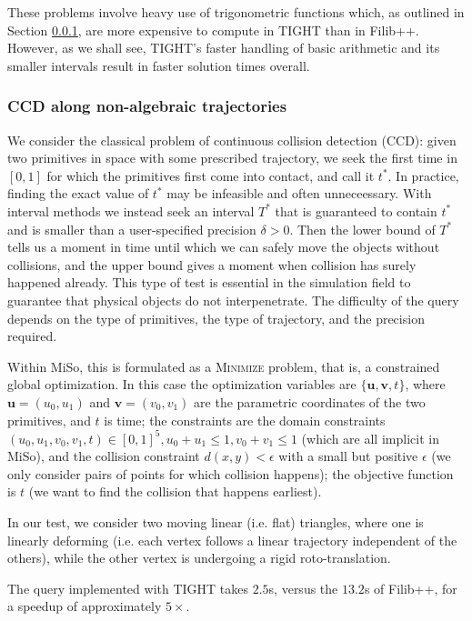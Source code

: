 These problems involve heavy use of trigonometric functions which, as outlined in Section \ref{}, are more expensive to compute in TIGHT than in Filib++.
However, as we shall see, TIGHT's faster handling of basic arithmetic and its smaller intervals result in faster solution times overall.

\subsubsection{CCD along non-algebraic trajectories}
We consider the classical problem of continuous collision detection (CCD): given two primitives in space with some prescribed trajectory, we seek the first time in $[0,1]$ for which the primitives first come into contact, and call it $t^*$.
In practice, finding the exact value of $t^*$ may be infeasible and often unneceessary. With interval methods we instead seek an interval $T^*$ that is guaranteed to contain $t^*$ and is smaller than a user-specified precision $\delta>0$.
Then the lower bound of $T^*$ tells us a moment in time until which we can safely move the objects without collisions, and the upper bound gives a moment when collision has surely happened already.
This type of test is essential in the simulation field to guarantee that physical objects do not interpenetrate.
The difficulty of the query depends on the type of primitives, the type of trajectory, and the precision required.

Within MiSo, this is formulated as a \textsc{Minimize} problem, that is, a constrained global optimization.
In this case the optimization variables are $\{\mathbf{u}, \mathbf{v}, t\}$, where $\mathbf{u}=(u_0, u_1)$ and $\mathbf{v}=(v_0, v_1)$ are the parametric coordinates of the two primitives, and $t$ is time;
the constraints are the domain constraints $(u_0,u_1,v_0,v_1,t)\in[0,1]^5, u_0+u_1\leq1, v_0+v_1\leq1$ (which are all implicit in MiSo), and the collision constraint $d(x,y)<\epsilon$ with a small but positive $\epsilon$ (we only consider pairs of points for which collision happens);
the objective function is $t$ (we want to find the collision that happens earliest).

In our test, we consider two moving linear (i.e. flat) triangles, where one is linearly deforming (i.e. each vertex follows a linear trajectory independent of the others), while the other vertex is undergoing a rigid roto-translation.

The query implemented with TIGHT takes $2.5$s, versus the $13.2$s of Filib++, for a speedup of approximately $5\times$.

